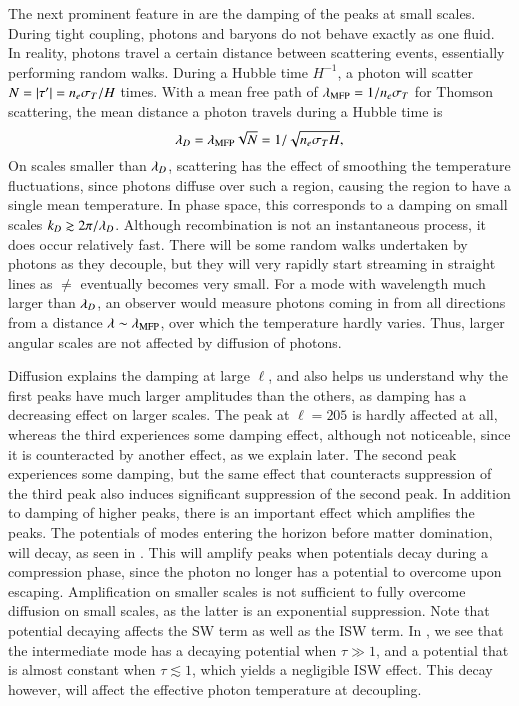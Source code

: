 The next prominent feature in  are the damping of the peaks at small scales. During tight coupling, photons and baryons do not behave exactly as one fluid. In reality, photons travel a certain distance between scattering events, essentially performing random walks. During a Hubble time $H^{-1}$, a photon will scatter $N=\abs{\tau'}=n_e \sigma_T / H$ times. With a mean free path of $\lambda_\mathrm{MFP}=1/n_e \sigma_T$ for Thomson scattering, the mean distance a photon travels during a Hubble time is 
\begin{equation}
    \lambda_D = \lambda_\mathrm{MFP} \sqrt{N} = 1 / \sqrt{n_e \sigma_T H},
\end{equation}
On scales smaller than $\lambda_D$, scattering has the effect of smoothing the temperature fluctuations, since photons diffuse over such a region, causing the region to have a single mean temperature. In phase space, this corresponds to a damping on small scales $k_D\gtrsim 2\pi/\lambda_D$. Although recombination is not an instantaneous process, it does occur relatively fast. There will be some random walks undertaken by photons as they decouple, but they will very rapidly start streaming in straight lines as $\ne$ eventually becomes very small. For a mode with wavelength much larger than $\lambda_D$, an observer would measure photons coming in from all directions from a distance $\lambda\sim\lambda_\mathrm{MFP}$, over which the temperature hardly varies. Thus, larger angular scales are not affected by diffusion of photons. 

Diffusion explains the damping at large $\ell$, and also helps us understand why the first peaks have much larger amplitudes than the others, as damping has a decreasing effect on larger scales. The peak at $\ell=205$ is hardly affected at all, whereas the third experiences some damping effect, although not noticeable, since it is counteracted by another effect, as we explain later. The second peak experiences some damping, but the same effect that counteracts suppression of the third peak also induces significant suppression of the second peak. In addition to damping of higher peaks, there is an important effect which amplifies the peaks. The potentials of modes entering the horizon before matter domination, will decay, as seen in . This will amplify peaks when potentials decay during a compression phase, since the photon no longer has a potential to overcome upon escaping. Amplification on smaller scales is not sufficient to fully overcome diffusion on small scales, as the latter is an exponential suppression. Note that potential decaying affects the SW term as well as the ISW term. In , we see that the intermediate mode has a decaying potential when $\tau\gg1$, and a potential that is almost constant when $\tau\lesssim1$, which yields a negligible ISW effect. This decay however, will affect the effective photon temperature at decoupling.    


